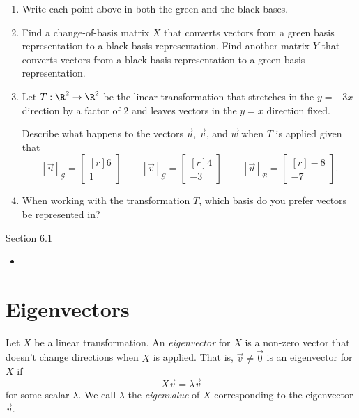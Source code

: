 \documentclass{problemset}
\newcommand{\mat}[1]{\begin{bmatrix*}[r]#1\end{bmatrix*}}
\begin{document}
\begin{enumerate}
	\item Write each point above in both the green and the black bases.
	\item Find a change-of-basis matrix $X$ that converts vectors from
		a green basis representation to a black basis representation. Find
		another matrix $Y$ that converts vectors from a black basis representation
		to a green basis representation.
	\item Let $T:\R^2\to\R^2$ be the linear transformation that stretches in the $y=-3x$ direction
		by a factor of $2$ and leaves vectors in the $y=x$ direction fixed.

		Describe what happens to the vectors $\vec u$, $\vec v$, and $\vec w$ when
		$T$ is applied given that 
		\[
			[\vec u]_{\mathcal G} = \mat{6\\1} \qquad 
			[\vec v]_{\mathcal G} = \mat{4\\-3} \qquad 
			[\vec u]_{\mathcal B} = \mat{-8\\-7}.
		\]
	\item When working with the transformation $T$, which basis do you prefer vectors be
		represented in?
\end{enumerate}




\newpage
\pagestyle{siefken}

\begin{lesson}
	\newpage

	Section 6.1

	\begin{itemize}
		\item 
	\end{itemize}


	\newpage
\end{lesson}
\section*{Eigenvectors}

	\vspace{-.6cm}
	\begin{definition}[Eigenvector]
	Let $X$ be a linear transformation.  An \emph{eigenvector} for $X$ is a non-zero vector that doesn't
	change directions when $X$ is applied.  That is, $\vec v\neq \vec 0$ is an eigenvector for $X$ if
	\[
		X\vec v=\lambda \vec v
	\]
	for some scalar $\lambda$.  We call $\lambda$ the \emph{eigenvalue} 
	of $X$ corresponding
	to the eigenvector $\vec v$.
	\end{definition}
	\vspace{-.2cm}
\end{document}
